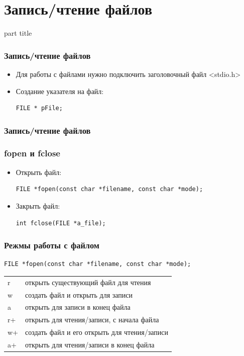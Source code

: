 \documentclass[14pt,pdf,hyperref={unicode}]{beamer}
\begin{document}
\section{Запись/чтение файлов}
\begin{frame}
\begin{center}
\begin{beamercolorbox}[sep=8pt,center]{part
title}
\insertsection
\end{beamercolorbox}
\end{center}
\end{frame}

\begin{frame}[fragile]
\frametitle{Запись/чтение файлов} 
\begin{itemize}
\item Для работы с файлами нужно подключить заголовочный файл <stdio.h>
\item Создание указателя на файл:
\begin{lstlisting}
FILE * pFile;
\end{lstlisting}
\end{itemize}
\end{frame}

\begin{frame}[fragile]
\frametitle{Запись/чтение файлов} 
\frametitle{fopen и fclose} 
\begin{itemize}
\item Открыть файл:
\begin{lstlisting}
FILE *fopen(const char *filename, const char *mode);
\end{lstlisting}
\item Закрыть файл:
\begin{lstlisting}
int fclose(FILE *a_file);
\end{lstlisting}
\end{itemize}
\end{frame}

\begin{frame}[fragile]
\frametitle{Режмы работы с файлом} 
\begin{lstlisting}
FILE *fopen(const char *filename, const char *mode);
\end{lstlisting}
\begin{tabular}{ l || l }
  r & открыть существующий файл для чтения \\
  w & создать файл и открыть для записи \\
  a & открыть для записи в конец файла \\
  r+ & открыть для чтения/записи, с начала файла  \\
  w+ & создать файл и его открыть для чтения/записи \\
  a+ & открыть для чтения/записи в конец файла \\
\end{tabular}
\end{frame}
\end{document}
